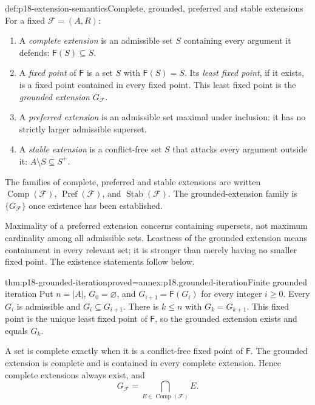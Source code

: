 \begin{hbdefinition}{def:p18-extension-semantics}{Complete, grounded, preferred and stable extensions}
For a fixed \(\mathcal F=(A,R)\):
\begin{enumerate}
\item A \emph{complete extension} is an admissible set \(S\) containing every
      argument it defends: \(\mathsf F(S)\subseteq S\).
\item A \emph{fixed point} of \(\mathsf F\) is a set \(S\) with
      \(\mathsf F(S)=S\). Its \emph{least fixed point}, if it exists,
      is a fixed point contained in every fixed point. This least fixed
      point is the \emph{grounded extension} \(G_{\mathcal F}\).
\item A \emph{preferred extension} is an admissible set maximal under
      inclusion: it has no strictly larger admissible superset.
\item A \emph{stable extension} is a conflict-free set \(S\) that attacks
      every argument outside it: \(A\setminus S\subseteq S^+\).
\end{enumerate}
The families of complete, preferred and stable extensions are written
\(\operatorname{Comp}(\mathcal F)\),
\(\operatorname{Pref}(\mathcal F)\), and
\(\operatorname{Stab}(\mathcal F)\). The grounded-extension family is
\(\{G_{\mathcal F}\}\) once existence has been established.

Maximality of a preferred extension concerns containing supersets, not
maximum cardinality among all admissible sets. Leastness of the grounded
extension means containment in every relevant set; it is stronger than
merely having no smaller fixed point. The existence statements follow below.
\end{hbdefinition}

\begin{hbtheorem}{thm:p18-grounded-iteration}{proved=annex:p18.grounded-iteration}{Finite grounded iteration}
Put \(n=|A|\), \(G_0=\varnothing\), and
\(G_{i+1}=\mathsf F(G_i)\) for every integer \(i\geq0\).
Every \(G_i\) is admissible and \(G_i\subseteq G_{i+1}\).
There is \(k\leq n\) with \(G_k=G_{k+1}\).
This fixed point is the unique least fixed point of \(\mathsf F\), so
the grounded extension exists and equals \(G_k\).

A set is complete exactly when it is a conflict-free fixed point of
\(\mathsf F\). The grounded extension is complete and is contained in
every complete extension. Hence complete extensions always exist, and
\[
 G_{\mathcal F}=\bigcap_{E\in\operatorname{Comp}(\mathcal F)}E.
\]
\end{hbtheorem}

